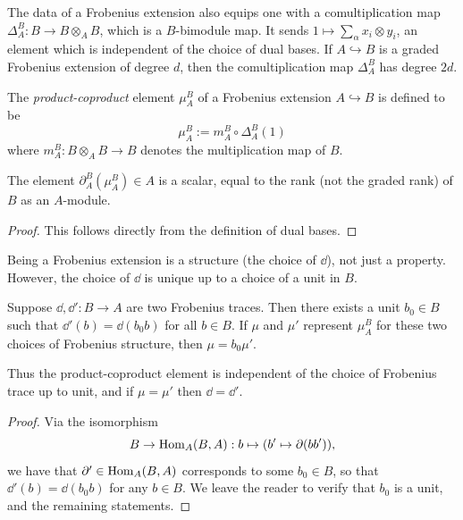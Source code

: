 The data of a Frobenius extension also equips one with a comultiplication map $\Delta^B_A : B \to B \otimes_A B$, which is a $B$-bimodule map.  It sends $1 \mapsto \sum_\alpha x_i \otimes
y_i$, an element which is independent of the choice of dual bases. If $A \hookrightarrow B$ is a graded Frobenius extension of degree $d$, then the comultiplication map $\Delta^B_A$ has degree $2d$.  

\begin{defn}\label{defn-product coproduct element}
    The \emph{product-coproduct} element $\mu^B_A$ of a Frobenius extension $A \hookrightarrow B$ is defined to be 
    $$\mu_A^B:=m^B_A\circ\Delta^B_A (1)$$
    where $m^B_A:B\otimes_AB \rightarrow B$ denotes the multiplication map of $B$.
\end{defn}

\begin{lemma}
The element $\partial^B_A(\mu^B_A) \in A$ is a scalar, equal to the rank (not the graded rank) of $B$ as an $A$-module. \end{lemma}

\begin{proof} This follows directly from the definition of dual bases. \end{proof}


Being a Frobenius extension is a structure (the choice of $\dd$), not just a property. However, the choice of $\dd$ is unique up to a choice of a unit in $B$. 

\begin{lemma} \label{lem Frobenius structures unique up to unit}
Suppose $\dd, \dd': B \rightarrow A$ are two Frobenius traces. Then there exists a unit $b_0 \in B$ such that $\dd'(b) = \dd(b_0 b)$ for all $b \in B$. If $\mu$ and $\mu'$ represent $\mu^B_A$ for these two choices of Frobenius structure, then $\mu = b_0 \mu'$.
    
Thus the product-coproduct element is independent of the choice of Frobenius trace up to unit, and if $\mu = \mu'$ then $\dd = \dd'$. \end{lemma} 

\begin{proof} Via the isomorphism 
    $$B \rightarrow \operatorname{Hom}_A(B,A): b \mapsto (b' \mapsto \partial(bb')),$$ we have that $\partial' \in \operatorname{Hom}_A(B,A)$ corresponds to some $b_0\in B$, so that $\dd'(b)=\dd(b_0b)$ for any $b \in B$. We leave the reader to verify that $b_0$ is a unit, and the remaining statements.
\end{proof}

    


